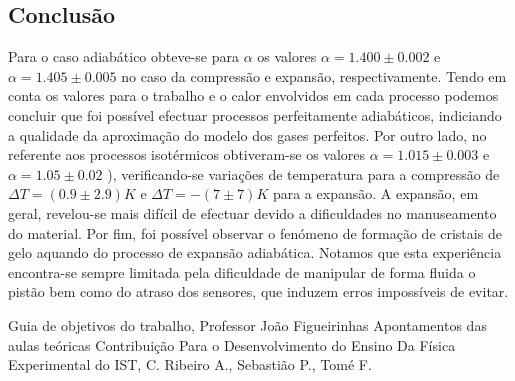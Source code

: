 \documentclass[9pt]{extarticle}
\begin{document}
\begin{multicols}{2}
\section{Conclusão}
\par Para o caso adiabático obteve-se para $\alpha$ os valores $\alpha=1.400\pm0.002$ e $\alpha=1.405\pm0.005$ no caso da compressão e expansão, respectivamente. Tendo em conta os valores para o trabalho e o calor envolvidos em cada processo podemos concluir que foi possível efectuar processos perfeitamente adiabáticos, indiciando a qualidade da aproximação do modelo dos gases perfeitos. Por outro lado, no referente aos processos isotérmicos obtiveram-se os valores $\alpha=1.015\pm0.003$ e $\alpha=1.05\pm0.02$ ), verificando-se variações de temperatura para a compressão de $\Delta T=(0.9\pm2.9)K$ e $\Delta T=-(7\pm7)K$ para a expansão. A expansão, em geral, revelou-se mais difícil de efectuar devido a dificuldades no manuseamento do material. Por fim, foi possível observar o fenómeno de formação de cristais de gelo aquando do processo de expansão adiabática. Notamos que esta experiência encontra-se sempre limitada pela dificuldade de manipular de forma fluida o pistão bem como do atraso dos sensores, que induzem erros impossíveis de evitar.

\begin{thebibliography}{9}

 Guia de objetivos do trabalho, Professor João Figueirinhas
 Apontamentos das aulas teóricas
 Contribuição Para o Desenvolvimento do Ensino Da Física Experimental do IST, C. Ribeiro A., Sebastião P., Tomé F.
\end{thebibliography}

\vfill
\pagebreak

\end{multicols}
\end{document}
